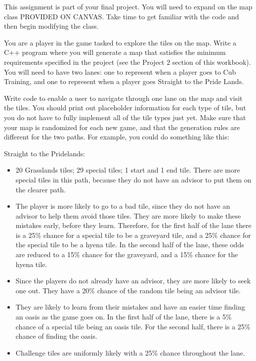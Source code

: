 This assignment is part of your final project. You will need to expand on the map class PROVIDED ON CANVAS. Take time to get familiar with the code and then begin modifying the class.

You are a player in the game tasked to explore the tiles on the map. Write a C++ program where you will generate a map that satisfies the minimum requirements specified in the project (see the Project 2 section of this workbook). You will need to have two lanes: one to represent when a player goes to Cub Training, and one to represent when a player goes Straight to the Pride Lands. 

Write code to enable a user to navigate through one lane on the map and visit the tiles. You should print out placeholder information for each type of tile, but you do not have to fully implement all of the tile types just yet. Make sure that your map is randomized for each new game, and that the generation rules are different for the two paths. For example, you could do something like this:

Straight to the Pridelands: %
\begin{itemize}
    \item 20 Grasslands tiles; 29 special tiles; 1 start and 1 end tile. There are more special tiles in this path, because they do not have an advisor to put them on the clearer path.
    \item The player is more likely to go to a bad tile, since they do not have an advisor to help them avoid those tiles. They are more likely to make these mistakes early, before they learn. Therefore, for the first half of the lane there is a 25\% chance for a special tile to be a graveyard tile, and a 25\% chance for the special tile to be a hyena tile. In the second half of the lane, these odds are reduced to a 15\% chance for the graveyard, and a 15\% chance for the hyena tile.
    \item Since the players do not already have an advisor, they are more likely to seek one out. They have a 20\% chance of the random tile being an advisor tile.
    \item They are likely to learn from their mistakes and have an easier time finding an oasis as the game goes on. In the first half of the lane, there is a 5\% chance of a special tile being an oasis tile. For the second half, there is a 25\% chance of finding the oasis. 
    \item Challenge tiles are uniformly likely with a 25\% chance throughout the lane.
\end{itemize}

